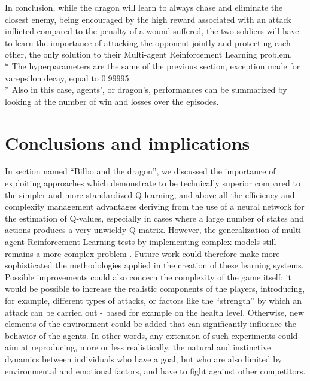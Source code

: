 In conclusion, while the dragon will learn to always chase and eliminate the closest enemy, being encouraged by the high reward associated with an attack inflicted compared to the penalty of a wound suffered, the two soldiers will have to learn the importance of attacking the opponent jointly and protecting each other, the only solution to their Multi-agent Reinforcement Learning problem.\\*
The hyperparameters are the same of the previous section, exception made for varepsilon decay, equal to 0.99995.\\*
Also in this case, agents', or dragon's, performances can be summarized by looking at the number of win and losses over the episodes.

\section{Conclusions and implications}
In section named ``Bilbo and the dragon'', we discussed the importance of exploiting approaches which demonstrate to be technically superior compared to the simpler and more standardized Q-learning, and above all the efficiency and complexity management advantages deriving from the use of a neural network for the estimation of Q-values, especially in cases where a large number of states and actions produces a very unwieldy Q-matrix. However, the generalization of multi-agent Reinforcement Learning tests by implementing complex models still remains a more complex problem \cite{1}. Future work could therefore make more sophisticated the methodologies applied in the creation of these learning systems.
Possible improvements could also concern the complexity of the game itself: it would be possible to increase the realistic components of the players, introducing, for example, different types of attacks, or factors like the ``strength'' by which an attack can be carried out - based for example on the health level. Otherwise, new elements of the environment could be added that can significantly influence the behavior of the agents.
In other words, any extension of such experiments could aim at reproducing, more or less realistically, the natural and instinctive dynamics between individuals who have a goal, but who are also limited by environmental and emotional factors, and have to fight against other competitors.
\pagebreak





